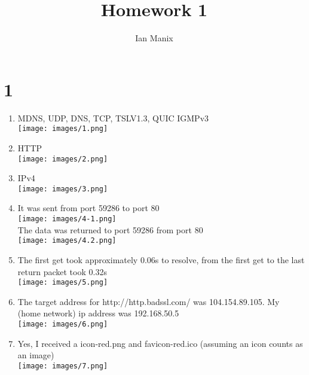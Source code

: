 \documentclass[sigconf]{article}
\title{
  \textbf{Homework 1} \\
  }
\author{ 
  Ian Manix
  }
\begin{document}



\maketitle




\section*{1}
\begin{enumerate}
  \item MDNS, UDP, DNS, TCP, TSLV1.3, QUIC IGMPv3 \\
        \texttt{[image: images/1.png]}
  \item HTTP \\
        \texttt{[image: images/2.png]}
  \item IPv4\\
        \texttt{[image: images/3.png]}
  \item It was sent from port 59286 to port 80 \\
        \texttt{[image: images/4-1.png]} \\
        The data was returned to port 59286 from port 80 \\
        \texttt{[image: images/4.2.png]}
  \item The first get took approximately 0.06s to resolve, from the first get to the last return packet took 0.32s\\
        \texttt{[image: images/5.png]}
  \item The target address for http://http.badssl.com/ was 104.154.89.105. My (home network) ip address was 192.168.50.5\\
        \texttt{[image: images/6.png]}
  \clearpage
  \item Yes, I received a icon-red.png and favicon-red.ico (assuming an icon counts as an image)\\
        \texttt{[image: images/7.png]}


\end{enumerate}




\end{document}
